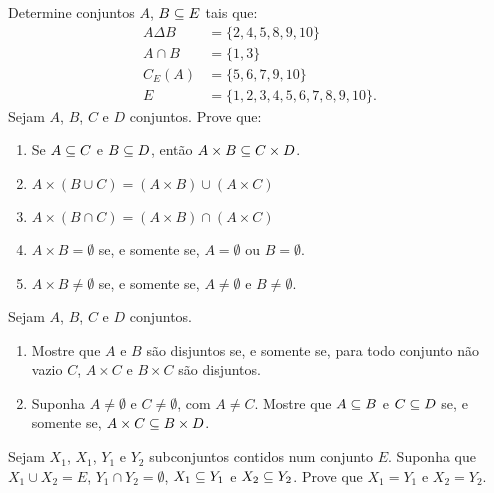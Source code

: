 \documentclass[12pt]{exam}
\begin{document}
\questao{} Determine conjuntos $A$, $B \subseteq E$ tais que:
\begin{align*}
    A \Delta B &= \{2, 4, 5, 8, 9, 10\}\\
    A \cap B &= \{1, 3\}\\
    C_E(A) &= \{5, 6, 7, 9, 10\}\\
    E &= \{1, 2, 3, 4, 5, 6, 7, 8, 9, 10\}.
\end{align*}
\questao{} Sejam $A$, $B$, $C$ e $D$ conjuntos. Prove que:
\begin{enumerate}[label={\alph*})]
    \item Se $A \subseteq C$ e $B \subseteq D$, ent\~ao $A \times B \subseteq C \times D$.
    \item $A \times (B \cup C) = (A \times B) \cup (A \times C)$
    \item $A \times (B \cap C) = (A \times B) \cap (A \times C)$
    \item $A \times B = \emptyset$ se, e somente se, $A = \emptyset$ ou $B = \emptyset$.
    \item $A \times B \ne \emptyset$ se, e somente se, $A \ne \emptyset$ e $B \ne \emptyset$.
\end{enumerate}

\questao{} Sejam $A$, $B$, $C$ e $D$ conjuntos.
\begin{enumerate}[label={\alph*})]
    \item Mostre que $A$ e $B$ s\~ao disjuntos se, e somente se, para todo conjunto n\~ao vazio $C$, $A \times C$ e $B \times C$ s\~ao disjuntos.
    \item Suponha $A \ne \emptyset$ e $C \ne \emptyset$, com $A \ne C$. Mostre que $A \subseteq B$ e $C \subseteq D$ se, e somente se, $A \times C \subseteq B \times D$.
\end{enumerate}

\vspace{.3cm}

\questao{} Sejam $X_1$, $X_1$, $Y_1$ e $Y_2$ subconjuntos contidos num conjunto $E$. Suponha que $X_1 \cup X_2 = E$, $Y_1 \cap Y_2 = \emptyset$, $X_1 \subseteq Y_1$ e $X_2 \subseteq Y_2$. Prove que $X_1 = Y_1$ e $X_2 = Y_2$.
\end{document}
